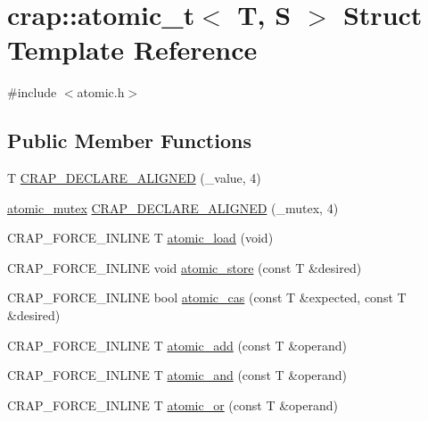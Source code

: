 \hypertarget{structcrap_1_1atomic__t}{\section{crap\+:\+:atomic\+\_\+t$<$ T, S $>$ Struct Template Reference}
\label{structcrap_1_1atomic__t}
}


{\ttfamily \#include $<$atomic.\+h$>$}

\subsection*{Public Member Functions}
\begin{DoxyCompactItemize}
\item 
T \hyperlink{structcrap_1_1atomic__t_acf41b173b37babd0638827d7bae9a37c}{C\+R\+A\+P\+\_\+\+D\+E\+C\+L\+A\+R\+E\+\_\+\+A\+L\+I\+G\+N\+E\+D} (\+\_\+value, 4)
\item 
\hyperlink{structcrap_1_1atomic__mutex}{atomic\+\_\+mutex} \hyperlink{structcrap_1_1atomic__t_a654b638e82309744b711741110a09a52}{C\+R\+A\+P\+\_\+\+D\+E\+C\+L\+A\+R\+E\+\_\+\+A\+L\+I\+G\+N\+E\+D} (\+\_\+mutex, 4)
\item 
C\+R\+A\+P\+\_\+\+F\+O\+R\+C\+E\+\_\+\+I\+N\+L\+I\+N\+E T \hyperlink{structcrap_1_1atomic__t_a34d508d934dd5d71e35ce1d57fc4d26e}{atomic\+\_\+load} (void)
\item 
C\+R\+A\+P\+\_\+\+F\+O\+R\+C\+E\+\_\+\+I\+N\+L\+I\+N\+E void \hyperlink{structcrap_1_1atomic__t_af5501086f0a564b67fa7a4187b1628ad}{atomic\+\_\+store} (const T \&desired)
\item 
C\+R\+A\+P\+\_\+\+F\+O\+R\+C\+E\+\_\+\+I\+N\+L\+I\+N\+E bool \hyperlink{structcrap_1_1atomic__t_aeef056d07aec9f4b447d27310fdb33e2}{atomic\+\_\+cas} (const T \&expected, const T \&desired)
\item 
C\+R\+A\+P\+\_\+\+F\+O\+R\+C\+E\+\_\+\+I\+N\+L\+I\+N\+E T \hyperlink{structcrap_1_1atomic__t_a085f2360bcc3f32e591c05b4946821c2}{atomic\+\_\+add} (const T \&operand)
\item 
C\+R\+A\+P\+\_\+\+F\+O\+R\+C\+E\+\_\+\+I\+N\+L\+I\+N\+E T \hyperlink{structcrap_1_1atomic__t_a1dc7264b4de620c3717d5d8f412b50d4}{atomic\+\_\+and} (const T \&operand)
\item 
C\+R\+A\+P\+\_\+\+F\+O\+R\+C\+E\+\_\+\+I\+N\+L\+I\+N\+E T \hyperlink{structcrap_1_1atomic__t_a1d1d71c3a2798875944291f837214922}{atomic\+\_\+or} (const T \&operand)
\end{DoxyCompactItemize}


